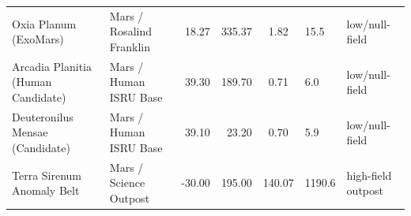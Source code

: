 \begin{table}[t]
\begin{tabular}{llrrcll}
Oxia Planum (ExoMars) & Mars / Rosalind Franklin & 18.27 & 335.37 & 1.82 & 15.5 & low/null-field \\
Arcadia Planitia (Human Candidate) & Mars / Human ISRU Base & 39.30 & 189.70 & 0.71 & 6.0 & low/null-field \\
Deuteronilus Mensae (Candidate) & Mars / Human ISRU Base & 39.10 & 23.20 & 0.70 & 5.9 & low/null-field \\
Terra Sirenum Anomaly Belt & Mars / Science Outpost & -30.00 & 195.00 & 140.07 & 1190.6 & high-field outpost \\
\bottomrule
\end{tabular}
\end{table}
